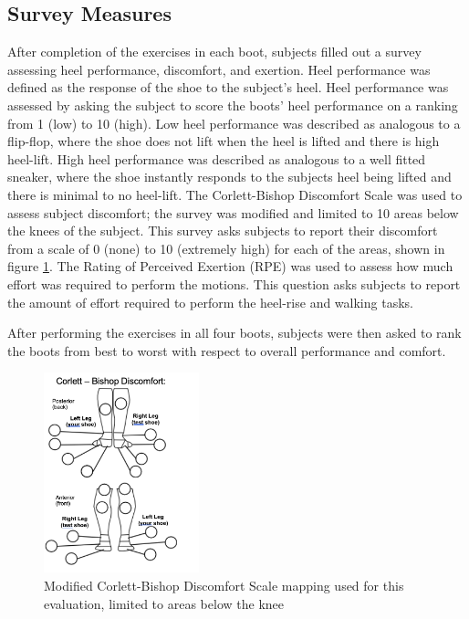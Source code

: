 \documentclass[defaultstyle,11pt]{thesis}
\begin{document}
\hypertarget{survey-measures}{%
\subsection{Survey Measures}\label{survey-measures}}

After completion of the exercises in each boot, subjects filled out a survey assessing heel performance, discomfort, and exertion.
Heel performance was defined as the response of the shoe to the subject's heel.
Heel performance was assessed by asking the subject to score the boots' heel performance on a ranking from 1 (low) to 10 (high).
Low heel performance was described as analogous to a flip-flop, where the shoe does not lift when the heel is lifted and there is high heel-lift.
High heel performance was described as analogous to a well fitted sneaker, where the shoe instantly responds to the subjects heel being lifted and there is minimal to no heel-lift.
The Corlett-Bishop Discomfort Scale \citep{Corlett1976} was used to assess subject discomfort; the survey was modified and limited to 10 areas below the knees of the subject.
This survey asks subjects to report their discomfort from a scale of 0 (none) to 10 (extremely high) for each of the areas, shown in figure \ref{fig:SA4-CB}.
The Rating of Perceived Exertion (RPE) \citep{Borg1982} was used to assess how much effort was required to perform the motions.
This question asks subjects to report the amount of effort required to perform the heel-rise and walking tasks.

After performing the exercises in all four boots, subjects were then asked to rank the boots from best to worst with respect to overall performance and comfort.

\begin{figure}
\hypertarget{fig:SA4-CB}{%
\centering
\includegraphics[width=0.4\textwidth,height=\textheight]{../fig/SA4/Corlett-Bishop.png}
\caption{Modified Corlett-Bishop Discomfort Scale mapping used for this evaluation, limited to areas below the knee}\label{fig:SA4-CB}
}
\end{figure}
\end{document}
